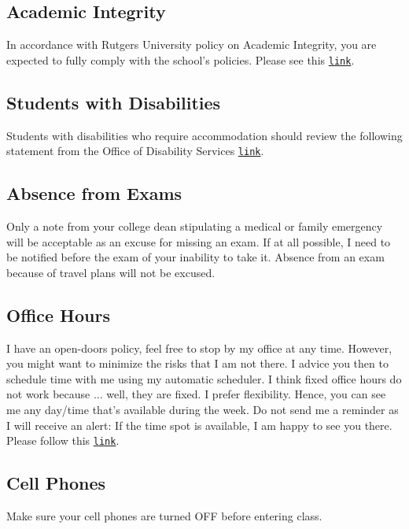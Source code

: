 \documentclass[letterpaper]{article}
\begin{document}
\subsection*{Academic Integrity}
In accordance with Rutgers University policy on Academic Integrity, you are expected to fully comply with the school's policies.  Please see this \href{http://academicintegrity.rutgers.edu}{\texttt{link}}.


\subsection*{Students with Disabilities}
Students with disabilities who require accommodation should review the following statement from the Office of Disability Services \href{https://ods.rutgers.edu/faculty/syllabus}{\texttt{link}}.


\subsection*{Absence from Exams}

Only a note from your college dean stipulating a medical or family emergency will be acceptable as an excuse for missing an exam. If at all possible, I need to be notified before the exam of your inability to take it. Absence from an exam because of travel plans will not be excused.


\subsection*{Office Hours}

I have an open-doors policy, feel free to stop by my office at any time. However, you might want to minimize the risks that I am not there. I advice you then to schedule time with me using my automatic scheduler. I think fixed office hours do not work because ... well, they are fixed. I prefer flexibility. Hence, you can see me any day/time that's available during the week. Do not send me a reminder as I will receive an alert: If the time spot is available, I am happy to see you there. Please follow this \href{https://calendly.com/bahamonde/officehours}{\texttt{link}}.


\subsection*{Cell Phones} 

Make sure your cell phones are turned OFF before entering class.
\end{document}
